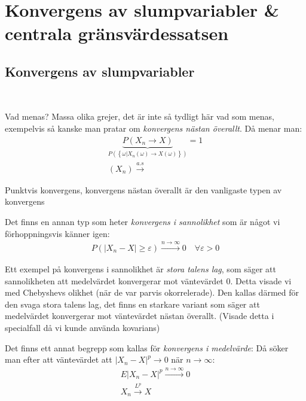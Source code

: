 \section{Konvergens av slumpvariabler \& centrala gränsvärdessatsen}\par
\subsection{Konvergens av slumpvariabler}\hfill\\\par
\noindent Vad menas? Massa olika grejer, det är inte så tydligt här vad som menas, exempelvis så kanske man pratar om \textit{konvergens nästan överallt}. Då menar man:
\begin{equation*}
  \begin{gathered}
  \underbrace{P(X_n\to X)}_{\text{$P(\left\{\omega|X_n(\omega)\to X(\omega)\right\})$}} = 1\\
  (X_n)\stackrel{a.s}{\rightarrow}
  \end{gathered}
\end{equation*}\par
\noindent Punktvis konvergens, konvergens nästan överallt är den vanligaste typen av konvergens
\par\bigskip
\noindent Det finns en annan typ som heter \textit{konvergens i sannolikhet} som är något vi förhoppningsvis känner igen:
\begin{equation*}
  \begin{gathered}
    P(\left|X_n-X\right|\geq\varepsilon)\stackrel{n\to\infty}{\rightarrow}0\quad\forall\varepsilon>0
  \end{gathered}
\end{equation*}\par
\noindent Ett exempel på konvergens i sannolikhet är \textit{stora talens lag}, som säger att sannolikheten att medelvärdet konvergerar mot väntevärdet 0. Detta visade vi med Chebyshevs olikhet (när de var parvis okorrelerade). Den kallas därmed för den svaga stora talens lag, det finns en starkare variant som säger att medelvärdet konvergerar mot väntevärdet nästan överallt. (Visade detta i specialfall då vi kunde använda kovarians) 
\par\bigskip
\noindent Det finns ett annat begrepp som kallas för \textit{konvergens i medelvärde}: Då söker man efter att väntevärdet att $\left|X_n-X\right|^p\to0$ när $n\to\infty$:
\begin{equation*}
  \begin{gathered}
    E\left|X_n-X\right|^p\stackrel{n\to\infty}{\rightarrow}0\\
    X_n\stackrel{L^p}{\rightarrow}X
  \end{gathered}
\end{equation*}\par
